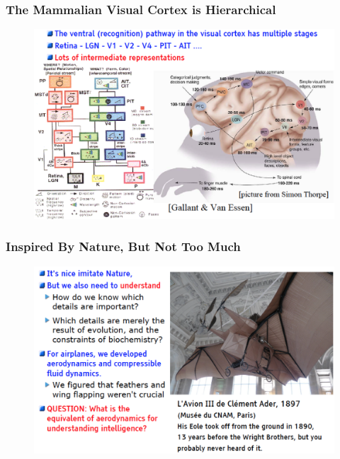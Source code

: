 \documentclass{beamer}
\begin{document}
\begin{frame}
\frametitle{The Mammalian Visual Cortex is Hierarchical}
\begin{figure}
      \includegraphics[width=1\textwidth]{figs/intro5.png}
\end{figure}
\end{frame}

\begin{frame}
\frametitle{Inspired By Nature, But Not Too Much}
\begin{figure}
      \includegraphics[width=1\textwidth]{figs/intro6.png}
\end{figure}
\end{frame}
\end{document}
